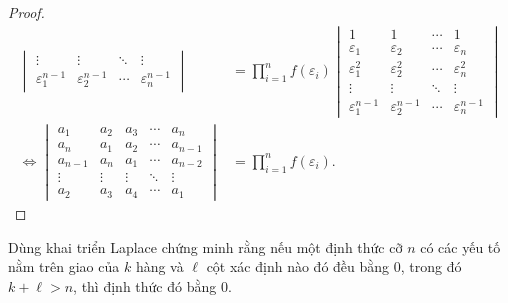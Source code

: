 \documentclass[class=nhvh-linear-algebra,crop=false]{standalone}
\begin{document}
\begin{proof}
\begin{align*}
\begin{vmatrix}
			\vdots                & \vdots                & \ddots & \vdots                \\
			\varepsilon_{1}^{n-1} & \varepsilon_{2}^{n-1} & \cdots & \varepsilon_{n}^{n-1}
		\end{vmatrix}
		 & =
		\prod^{n}_{i=1}f(\varepsilon_{i})
		\begin{vmatrix}
			1                     & 1                     & \cdots & 1                     \\
			\varepsilon_{1}       & \varepsilon_{2}       & \cdots & \varepsilon_{n}       \\
			\varepsilon_{1}^{2}   & \varepsilon_{2}^{2}   & \cdots & \varepsilon_{n}^{2}   \\
			\vdots                & \vdots                & \ddots & \vdots                \\
			\varepsilon_{1}^{n-1} & \varepsilon_{2}^{n-1} & \cdots & \varepsilon_{n}^{n-1}
		\end{vmatrix} \\
		\Leftrightarrow
		\begin{vmatrix}
			a_{1}   & a_{2}  & a_{3}  & \cdots & a_{n}   \\
			a_{n}   & a_{1}  & a_{2}  & \cdots & a_{n-1} \\
			a_{n-1} & a_{n}  & a_{1}  & \cdots & a_{n-2} \\
			\vdots  & \vdots & \vdots & \ddots & \vdots  \\
			a_{2}   & a_{3}  & a_{4}  & \cdots & a_{1}
		\end{vmatrix}
		 & =
		\prod^{n}_{i=1}f(\varepsilon_{i}).
	\end{align*}
\end{proof}

\begin{exercise}
	\par Dùng khai triển Laplace chứng minh rằng nếu một định thức cỡ $n$ có các yếu tố nằm trên giao của $k$ hàng và $\ell$ cột xác định nào đó đều bằng 0, trong đó $k + \ell > n$, thì định thức đó bằng 0.
\end{exercise}
\end{document}
